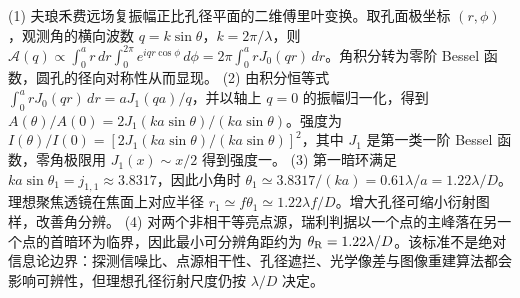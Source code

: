 (1) 夫琅禾费远场复振幅正比孔径平面的二维傅里叶变换。取孔面极坐标 \((r,\phi)\)，观测角的横向波数 \(q=k\sin\theta\)，\(k=2\pi/\lambda\)，则 \(\mathcal A(q)\propto\int_0^a r\,dr\int_0^{2\pi}e^{iqr\cos\phi}\,d\phi=2\pi\int_0^arJ_0(qr)\,dr\)。角积分转为零阶 Bessel 函数，圆孔的径向对称性从而显现。
(2) 由积分恒等式 \(\int_0^a rJ_0(qr)\,dr=aJ_1(qa)/q\)，并以轴上 \(q=0\) 的振幅归一化，得到 \(A(\theta)/A(0)=2J_1(ka\sin\theta)/(ka\sin\theta)\)。强度为 \(I(\theta)/I(0)=[2J_1(ka\sin\theta)/(ka\sin\theta)]^2\)，其中 \(J_1\) 是第一类一阶 Bessel 函数，零角极限用 \(J_1(x)\sim x/2\) 得到强度一。
(3) 第一暗环满足 \(ka\sin\theta_1=j_{1,1}\approx3.8317\)，因此小角时 \(\theta_1\simeq3.8317/(ka)=0.61\lambda/a=1.22\lambda/D\)。理想聚焦透镜在焦面上对应半径 \(r_1\simeq f\theta_1\simeq1.22\lambda f/D\)。增大孔径可缩小衍射图样，改善角分辨。
(4) 对两个非相干等亮点源，瑞利判据以一个点的主峰落在另一个点的首暗环为临界，因此最小可分辨角距约为 \(\theta_{\rm R}=1.22\lambda/D\)。该标准不是绝对信息论边界：探测信噪比、点源相干性、孔径遮拦、光学像差与图像重建算法都会影响可辨性，但理想孔径衍射尺度仍按 \(\lambda/D\) 决定。
